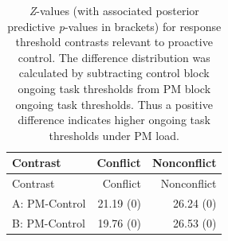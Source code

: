 \documentclass[11pt,]{article}
\begin{document}
\begin{longtable}[]{@{}lrr@{}}
\caption{\emph{Z}-values (with associated posterior predictive
\emph{p}-values in brackets) for response threshold contrasts relevant
to proactive control. The difference distribution was calculated by
subtracting control block ongoing task thresholds from PM block ongoing
task thresholds. Thus a positive difference indicates higher ongoing
task thresholds under PM load.}\tabularnewline
\toprule
\begin{minipage}[b]{0.18\columnwidth}\raggedright\strut
Contrast\strut
\end{minipage} & \begin{minipage}[b]{0.14\columnwidth}\raggedleft\strut
Conflict\strut
\end{minipage} & \begin{minipage}[b]{0.16\columnwidth}\raggedleft\strut
Nonconflict\strut
\end{minipage}\tabularnewline
\midrule
\endfirsthead
\toprule
\begin{minipage}[b]{0.18\columnwidth}\raggedright\strut
Contrast\strut
\end{minipage} & \begin{minipage}[b]{0.14\columnwidth}\raggedleft\strut
Conflict\strut
\end{minipage} & \begin{minipage}[b]{0.16\columnwidth}\raggedleft\strut
Nonconflict\strut
\end{minipage}\tabularnewline
\midrule
\endhead
\begin{minipage}[t]{0.18\columnwidth}\raggedright\strut
A: PM-Control\strut
\end{minipage} & \begin{minipage}[t]{0.14\columnwidth}\raggedleft\strut
21.19 (0)\strut
\end{minipage} & \begin{minipage}[t]{0.16\columnwidth}\raggedleft\strut
26.24 (0)\strut
\end{minipage}\tabularnewline
\begin{minipage}[t]{0.18\columnwidth}\raggedright\strut
B: PM-Control\strut
\end{minipage} & \begin{minipage}[t]{0.14\columnwidth}\raggedleft\strut
19.76 (0)\strut
\end{minipage} & \begin{minipage}[t]{0.16\columnwidth}\raggedleft\strut
26.53 (0)\strut
\end{minipage}\tabularnewline

\end{longtable}
\end{document}
